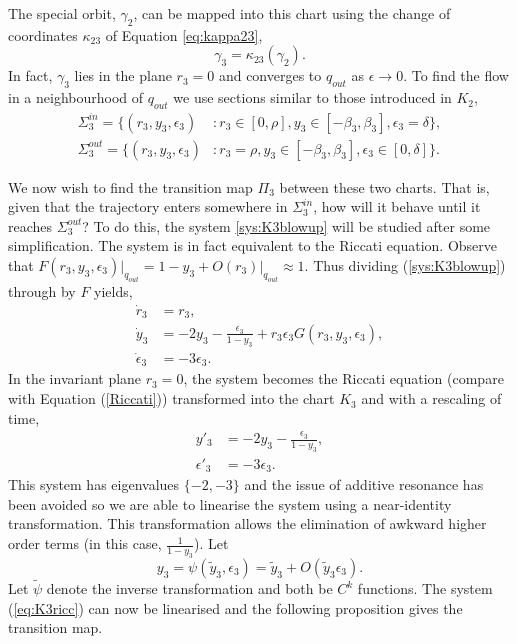 The special orbit, $\gamma_2$, can be mapped into this chart using the change of coordinates $\kappa_{23}$ of Equation \ref{eq:kappa23},
$$\gamma_3=\kappa_{23}(\gamma_2).$$
In fact, $\gamma_3$ lies in the plane $r_3=0$ and converges to $q_{out}$ as $\epsilon \to 0$. To find the flow in a neighbourhood of $q_{out}$ we use sections similar to those introduced in $K_2$,
\begin{align*} \Sigma_3^{in} =\lbrace(r_3,y_3,\epsilon_3) &: r_3\in[0,\rho], y_3 \in [-\beta_3,\beta_3], \epsilon_3=\delta\rbrace,\\
\Sigma_3^{out} =\lbrace(r_3,y_3,\epsilon_3) &: r_3=\rho, y_3 \in [-\beta_3,\beta_3], \epsilon_3\in[0,\delta]\rbrace.
\end{align*}

We now wish to find the transition map $\Pi_3$ between these two charts. That is, given that the trajectory enters somewhere in $\Sigma_3^{in}$, how will it behave until it reaches $\Sigma_3^{out}$? To do this, the system \ref{sys:K3blowup} will be studied after some simplification. The system is in fact equivalent to the Riccati equation. Observe that $F(r_3,y_3,\epsilon_3)\big|_{q_{out}} = 1-y_3 + O(r_3)\big|_{q_{out}} \approx 1 $. Thus dividing (\ref{sys:K3blowup}) through by $F$ yields,
\begin{subequations}
	\begin{align}
	\dot{r}_3&=r_3,\\
	\dot{y}_3&=-2y_3 - \frac{\epsilon_3}{1-y_3}+r_3\epsilon_3 G(r_3,y_3,\epsilon_3),\\
	\dot{\epsilon}_3 &= -3\epsilon_3.
	\end{align}
	\label{eq:K3ricc}
\end{subequations}
In the invariant plane $r_3=0$, the system becomes the Riccati equation (compare with Equation (\ref{Riccati})) transformed into the chart $K_3$ and with a rescaling of time,
\begin{align*}
y'_3 &= -2y_3-\frac{\epsilon_3}{1-y_3},\\
\epsilon'_3 &= -3\epsilon_3.
\end{align*}
This system has eigenvalues $\lbrace -2,-3\rbrace$ and the issue of additive resonance has been avoided so we are able to linearise the system using a near-identity transformation. This transformation allows the elimination of awkward higher order terms (in this case, $\frac{1}{1-y_3}$). Let
$$y_3=\psi(\tilde{y}_3,\epsilon_3)=\tilde{y}_3+O(\tilde{y}_3\epsilon_3).$$
Let $\tilde{\psi}$ denote the inverse transformation and both be $C^k$ functions. The system (\ref{eq:K3ricc}) can now be linearised and the following proposition gives the transition map.


